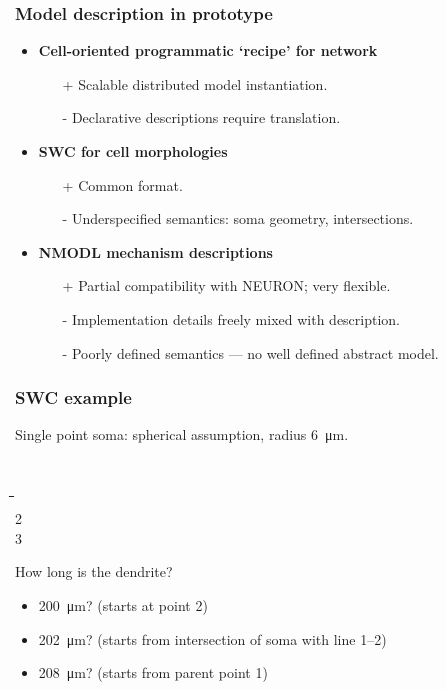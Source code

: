 \documentclass[aspectratio=43,12pt]{beamer}
\begin{document}
\begin{frame}
\frametitle{Model description in prototype}
\vfill
\begin{itemize}
\item<+-> \textbf{Cell-oriented programmatic `recipe' for network}
\begin{itemize}
\item[+] Scalable distributed model instantiation.
\item[-] Declarative descriptions require translation. 
\end{itemize}
\item<+-> \textbf{SWC for cell morphologies}
\begin{itemize}
\item[+] Common format.
\item[-] Underspecified semantics: soma geometry, intersections.
\end{itemize}
\item<0> \textbf{NMODL mechanism descriptions}
\begin{itemize}
\item[+] Partial compatibility with NEURON; very flexible.
\item[-] Implementation details freely mixed with description.
\item[-] Poorly defined semantics --- no well defined abstract model.
\end{itemize}
\end{itemize}
\vfill
\end{frame}

\begin{frame}[fragile]
\frametitle{SWC example}

Single point soma: spherical assumption, radius \SI{6}{\micro\metre}.\\
\begin{center}
\colorbox{black!10}{
\ssmall\tt
\begin{minipage}[t][7.5ex][t]{0.92\textwidth}
\begin{tabbing}
\hspace*{2em}\=\hspace*{2em}\=\hspace*{4em}\=\hspace*{4em}\=\hspace*{4em}\=\hspace*{4em}\=        \\
2        \\
3      \\
\end{tabbing}
\end{minipage}
}
\end{center}
\pause
How long is the dendrite?
\begin{itemize}
\item \SI{200}{\micro\metre}? (starts at point 2)
\item \SI{202}{\micro\metre}? (starts from intersection of soma with line 1--2)
\item \SI{208}{\micro\metre}? (starts from parent point 1)
\end{itemize}
\end{frame}
\end{document}
